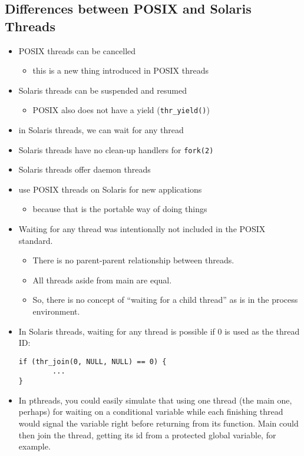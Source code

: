 
\subsection{Differences between POSIX and Solaris Threads}

\begin{itemize}
\item POSIX threads can be cancelled
	\begin{itemize}
	\item this is a new thing introduced in POSIX threads
	\end{itemize}

\item Solaris threads can be suspended and resumed
	\begin{itemize}
	\item POSIX also does not have a yield (\texttt{thr\_yield()})
	\end{itemize}
\item in Solaris threads, we can wait for any thread
\item Solaris threads have no clean-up handlers for \texttt{fork(2)}
\item Solaris threads offer daemon threads
\item use POSIX threads on Solaris for new applications
	\begin{itemize}
	\item because that is the portable way of doing things
	\end{itemize}
\end{itemize}


\begin{itemize}
\item Waiting for any thread was intentionally not included in the POSIX
standard.
	\begin{itemize}
	\item There is no parent-parent relationship between threads.
	\item All threads aside from main are equal.
	\item So, there is no concept of ``waiting for a child thread'' as is in
	the pro\-cess environment.
	\end{itemize}
\item In Solaris threads, waiting for any thread is possible if 0 is used as the
thread ID:

\begin{verbatim}
if (thr_join(0, NULL, NULL) == 0) {
        ...
}
\end{verbatim}
\item In pthreads, you could easily simulate that using one thread (the main
one, perhaps) for waiting on a conditional variable while each finishing thread
would signal the variable right before returning from its function. Main could
then join the thread, getting its id from a protected global variable, for
example.
\end{itemize}

